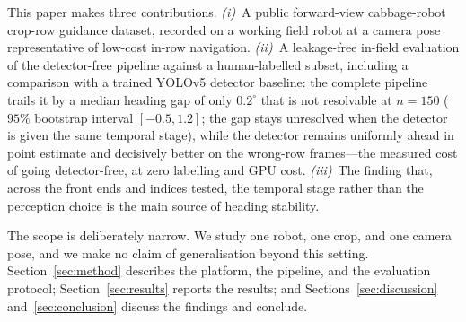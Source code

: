 \noindent This paper makes three contributions. \emph{(i)}~A public forward-view cabbage-robot crop-row
guidance dataset, recorded on a working field robot at a camera pose representative of low-cost in-row
navigation. \emph{(ii)}~A leakage-free in-field evaluation of the detector-free pipeline against a
human-labelled subset, including a comparison with a trained YOLOv5 detector baseline: the complete pipeline
trails it by a median heading gap of only $0.2^\circ$ that is not resolvable at $n=150$ ($95\%$ bootstrap
interval $[-0.5,1.2]$; the gap stays unresolved when the detector is given the same temporal stage), while
the detector remains uniformly ahead in point estimate and decisively better on the wrong-row frames---the
measured cost of going detector-free, at zero labelling and GPU cost. \emph{(iii)}~The finding that, across the front ends and indices tested, the temporal stage
rather than the perception choice is the main source of heading stability.

\noindent The scope is deliberately narrow. We study one robot, one crop, and one camera pose, and we make
no claim of generalisation beyond this setting.
Section~\ref{sec:method} describes the platform, the pipeline, and the evaluation protocol;
Section~\ref{sec:results} reports the results; and Sections~\ref{sec:discussion} and~\ref{sec:conclusion}
discuss the findings and conclude.
